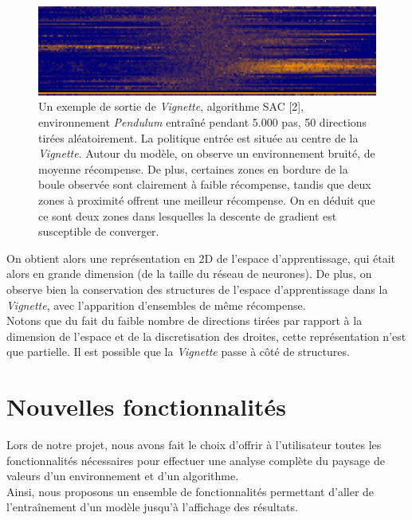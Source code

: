 \documentclass[12pt]{article}
\begin{document}
\begin{figure}[htp]
    \centering
    \includegraphics[width=15cm]{Images/Vignette_pendulum}
    \caption{Un exemple de sortie de \emph{Vignette}, algorithme SAC  [2], environnement \emph{Pendulum} entraîné pendant 5.000 pas, 50 directions tirées aléatoirement. La politique entrée est située au centre de la \emph{Vignette}. Autour du modèle, on observe un environnement bruité, de moyenne récompense. De plus, certaines zones en bordure de la boule observée sont clairement à faible récompense, tandis que deux zones à proximité offrent une meilleur récompense. On en déduit que ce sont deux zones dans lesquelles la descente de gradient est susceptible de converger.}
    \label{fig:vignettePendulum}
\end{figure}

\newpage
On obtient alors une représentation en 2D de l’espace d’apprentissage, qui était alors en grande dimension (de la taille du réseau de neurones). De plus, on observe bien la conservation des structures de l'espace d'apprentissage dans la \emph{Vignette}, avec l'apparition d'ensembles de même récompense. \\

Notons que du fait du faible nombre de directions tirées par rapport à la dimension de l'espace et de la discretisation des droites, cette représentation n’est que partielle. Il est possible que la \emph{Vignette} passe à côté de structures. \\

\section{Nouvelles fonctionnalités}

Lors de notre projet, nous avons fait le choix d'offrir à l'utilisateur toutes les fonctionnalités nécessaires pour effectuer une analyse complète du paysage de valeurs d'un environnement et d'un algorithme. \\

Ainsi, nous proposons un ensemble de fonctionnalités permettant d'aller de l'entraînement d'un modèle jusqu'à l'affichage des résultats. \\
\end{document}
